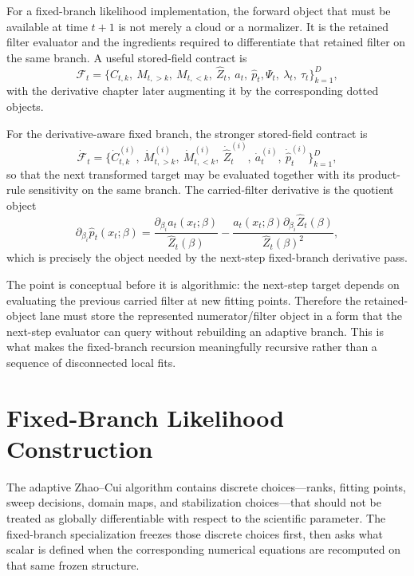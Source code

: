For a fixed-branch likelihood implementation, the forward object that must be
available at time \(t+1\) is not merely a cloud or a normalizer.  It is the
retained filter evaluator and the ingredients required to differentiate that
retained filter on the same branch.  A useful stored-field contract is
\begin{equation}
  \mathcal F_t=
  \{C_{t,k},\ M_{t,>k},\ M_{t,<k},\ \widehat Z_t,\ a_t,\ \widehat p_t,
    \Psi_t,\ \lambda_t,\ \tau_t\}_{k=1}^{D},
  \label{eq:bf-hd-squared-tt-stored-forward}
\end{equation}
with the derivative chapter later augmenting it by the corresponding dotted
objects.

For the derivative-aware fixed branch, the stronger stored-field contract is
\begin{equation}
  \dot{\mathcal F}_t=
  \{\dot C_{t,k}^{(i)},\ \dot M_{t,>k}^{(i)},\ \dot M_{t,<k}^{(i)},\
    \dot{\widehat Z}_t^{(i)},\ \dot a_t^{(i)},\ \dot{\widehat p}_t^{(i)}\}_{k=1}^{D},
  \label{eq:bf-hd-squared-tt-stored-derivative}
\end{equation}
so that the next transformed target may be evaluated together with its product-rule
sensitivity on the same branch.  The carried-filter derivative is the quotient
object
\begin{equation}
  \partial_{\beta_i}\widehat p_t(x_t;\beta)
  =
  \frac{\partial_{\beta_i}a_t(x_t;\beta)}{\widehat Z_t(\beta)}
  -
  \frac{a_t(x_t;\beta)\partial_{\beta_i}\widehat Z_t(\beta)}{\widehat Z_t(\beta)^2},
  \label{eq:bf-hd-squared-tt-carried-derivative}
\end{equation}
which is precisely the object needed by the next-step fixed-branch derivative
pass.

The point is conceptual before it is algorithmic: the next-step target depends
on evaluating the previous carried filter at new fitting points.  Therefore the
retained-object lane must store the represented numerator/filter object in a form
that the next-step evaluator can query without rebuilding an adaptive branch.
This is what makes the fixed-branch recursion meaningfully recursive rather than a
sequence of disconnected local fits.

\section{Fixed-Branch Likelihood Construction}
\label{sec:bf-hd-squared-tt-fixed-branch-likelihood}

The adaptive Zhao--Cui algorithm contains discrete choices---ranks, fitting
points, sweep decisions, domain maps, and stabilization choices---that should not
be treated as globally differentiable with respect to the scientific parameter.
The fixed-branch specialization freezes those discrete choices first, then asks
what scalar is defined when the corresponding numerical equations are recomputed
on that same frozen structure.


